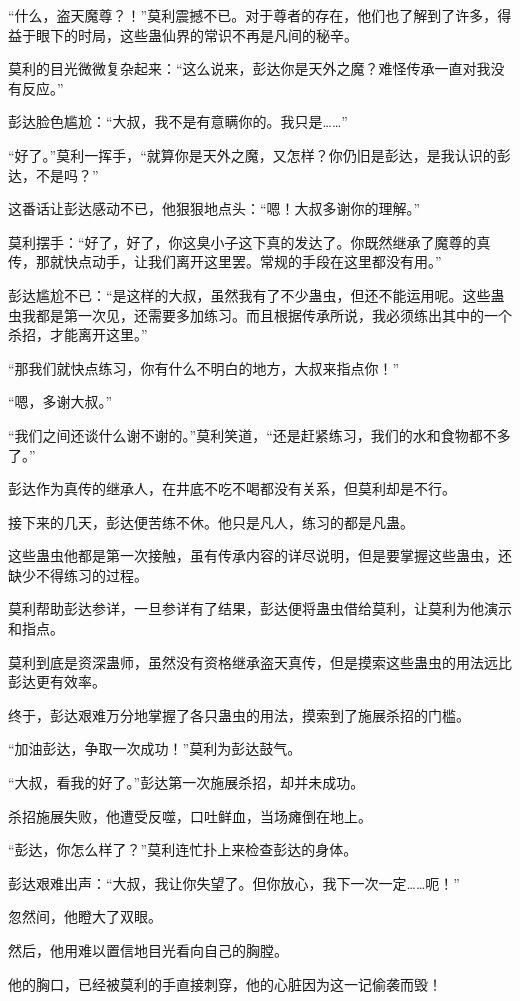 \begin{this_body}
“什么，盗天魔尊？！”莫利震撼不已。对于尊者的存在，他们也了解到了许多，得益于眼下的时局，这些蛊仙界的常识不再是凡间的秘辛。

莫利的目光微微复杂起来：“这么说来，彭达你是天外之魔？难怪传承一直对我没有反应。”

彭达脸色尴尬：“大叔，我不是有意瞒你的。我只是……”

“好了。”莫利一挥手，“就算你是天外之魔，又怎样？你仍旧是彭达，是我认识的彭达，不是吗？”

这番话让彭达感动不已，他狠狠地点头：“嗯！大叔多谢你的理解。”

莫利摆手：“好了，好了，你这臭小子这下真的发达了。你既然继承了魔尊的真传，那就快点动手，让我们离开这里罢。常规的手段在这里都没有用。”

彭达尴尬不已：“是这样的大叔，虽然我有了不少蛊虫，但还不能运用呢。这些蛊虫我都是第一次见，还需要多加练习。而且根据传承所说，我必须练出其中的一个杀招，才能离开这里。”

“那我们就快点练习，你有什么不明白的地方，大叔来指点你！”

“嗯，多谢大叔。”

“我们之间还谈什么谢不谢的。”莫利笑道，“还是赶紧练习，我们的水和食物都不多了。”

彭达作为真传的继承人，在井底不吃不喝都没有关系，但莫利却是不行。

接下来的几天，彭达便苦练不休。他只是凡人，练习的都是凡蛊。

这些蛊虫他都是第一次接触，虽有传承内容的详尽说明，但是要掌握这些蛊虫，还缺少不得练习的过程。

莫利帮助彭达参详，一旦参详有了结果，彭达便将蛊虫借给莫利，让莫利为他演示和指点。

莫利到底是资深蛊师，虽然没有资格继承盗天真传，但是摸索这些蛊虫的用法远比彭达更有效率。

终于，彭达艰难万分地掌握了各只蛊虫的用法，摸索到了施展杀招的门槛。

“加油彭达，争取一次成功！”莫利为彭达鼓气。

“大叔，看我的好了。”彭达第一次施展杀招，却并未成功。

杀招施展失败，他遭受反噬，口吐鲜血，当场瘫倒在地上。

“彭达，你怎么样了？”莫利连忙扑上来检查彭达的身体。

彭达艰难出声：“大叔，我让你失望了。但你放心，我下一次一定……呃！”

忽然间，他瞪大了双眼。

然后，他用难以置信地目光看向自己的胸膛。

他的胸口，已经被莫利的手直接刺穿，他的心脏因为这一记偷袭而毁！


\end{this_body}
